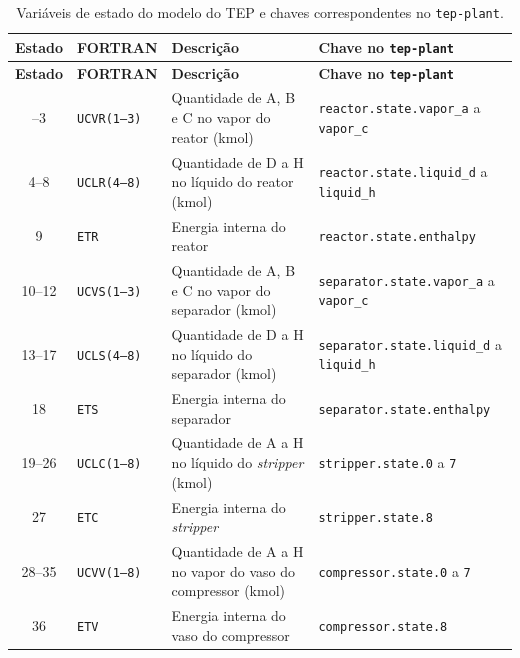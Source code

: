 \begingroup
\small
\begin{longtable}{|c|l|>{\raggedright\arraybackslash}p{4.3cm}|>{\raggedright\arraybackslash}p{6.0cm}|}
	\caption{Variáveis de estado do modelo do TEP e chaves correspondentes no \texttt{tep-plant}.}
	\label{tab:estados_tep} \\
	\hline
	\textbf{Estado} & \textbf{FORTRAN} & \textbf{Descrição} & \textbf{Chave no \texttt{tep-plant}} \\
	\hline
	\endfirsthead
	\hline
	\textbf{Estado} & \textbf{FORTRAN} & \textbf{Descrição} & \textbf{Chave no \texttt{tep-plant}} \\
	\hline
	\endhead
	\hline
	\endfoot
	1--3   & \texttt{UCVR(1--3)} & Quantidade de A, B e C no vapor do reator (kmol) & \texttt{reactor.\allowbreak{}state.\allowbreak{}vapor\_a} a \texttt{vapor\_c} \\
	4--8   & \texttt{UCLR(4--8)} & Quantidade de D a H no líquido do reator (kmol) & \texttt{reactor.\allowbreak{}state.\allowbreak{}liquid\_d} a \texttt{liquid\_h} \\
	9      & \texttt{ETR}        & Energia interna do reator & \texttt{reactor.\allowbreak{}state.\allowbreak{}enthalpy} \\
	\hline
	10--12 & \texttt{UCVS(1--3)} & Quantidade de A, B e C no vapor do separador (kmol) & \texttt{separator.\allowbreak{}state.\allowbreak{}vapor\_a} a \texttt{vapor\_c} \\
	13--17 & \texttt{UCLS(4--8)} & Quantidade de D a H no líquido do separador (kmol) & \texttt{separator.\allowbreak{}state.\allowbreak{}liquid\_d} a \texttt{liquid\_h} \\
	18     & \texttt{ETS}        & Energia interna do separador & \texttt{separator.\allowbreak{}state.\allowbreak{}enthalpy} \\
	\hline
	19--26 & \texttt{UCLC(1--8)} & Quantidade de A a H no líquido do \textit{stripper} (kmol) & \texttt{stripper.\allowbreak{}state.\allowbreak{}0} a \texttt{7} \\
	27     & \texttt{ETC}        & Energia interna do \textit{stripper} & \texttt{stripper.\allowbreak{}state.\allowbreak{}8} \\
	\hline
	28--35 & \texttt{UCVV(1--8)} & Quantidade de A a H no vapor do vaso do compressor (kmol) & \texttt{compressor.\allowbreak{}state.\allowbreak{}0} a \texttt{7} \\
	36     & \texttt{ETV}        & Energia interna do vaso do compressor & \texttt{compressor.\allowbreak{}state.\allowbreak{}8} \\
	\hline

\end{longtable}
